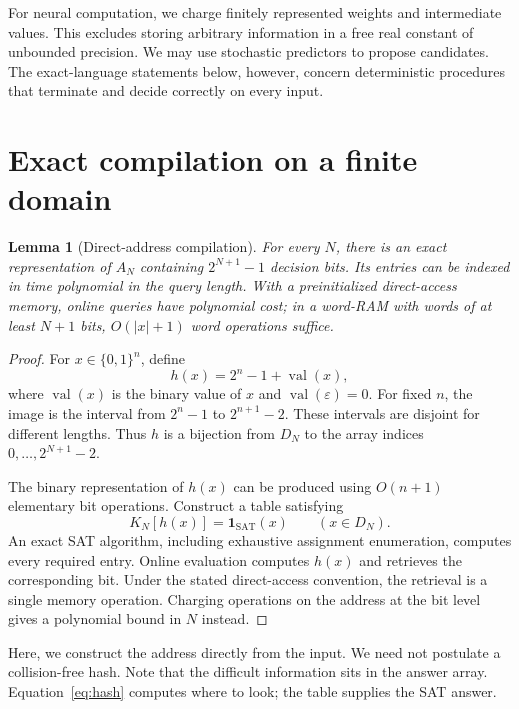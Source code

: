 \documentclass[11pt,a4paper]{article}
\numberwithin{equation}{section}
\newcommand{\SAT}{\mathrm{SAT}}
\newcommand{\bits}{\{0,1\}}
\newcommand{\ind}{\mathbf{1}}
\newcommand{\val}{\operatorname{val}}
\theoremstyle{plain}
\newtheorem{lemma}{Lemma}[section]
\theoremstyle{definition}
\theoremstyle{remark}
\begin{document}
For neural computation, we charge finitely represented weights and intermediate values. This excludes storing arbitrary information in a free real constant of unbounded precision. We may use stochastic predictors to propose candidates. The exact-language statements below, however, concern deterministic procedures that terminate and decide correctly on every input.

\section{Exact compilation on a finite domain}
\label{sec:table}

\begin{lemma}[Direct-address compilation]
\label{lem:table}
For every $N$, there is an exact representation of $A_N$ containing $2^{N+1}-1$ decision bits. Its entries can be indexed in time polynomial in the query length. With a preinitialized direct-access memory, online queries have polynomial cost; in a word-RAM with words of at least $N+1$ bits, $O(|x|+1)$ word operations suffice.
\end{lemma}

\begin{proof}
For $x\in\bits^n$, define
\begin{equation}
h(x)=2^n-1+\val(x),
\label{eq:hash}
\end{equation}
where $\val(x)$ is the binary value of $x$ and $\val(\varepsilon)=0$. For fixed $n$, the image is the interval from $2^n-1$ to $2^{n+1}-2$. These intervals are disjoint for different lengths. Thus $h$ is a bijection from $D_N$ to the array indices $0,\ldots,2^{N+1}-2$.

The binary representation of $h(x)$ can be produced using $O(n+1)$ elementary bit operations. Construct a table satisfying
\begin{equation}
K_N[h(x)]=\ind_{\SAT}(x)\qquad(x\in D_N).
\end{equation}
An exact SAT algorithm, including exhaustive assignment enumeration, computes every required entry. Online evaluation computes $h(x)$ and retrieves the corresponding bit. Under the stated direct-access convention, the retrieval is a single memory operation. Charging operations on the address at the bit level gives a polynomial bound in $N$ instead.
\end{proof}

Here, we construct the address directly from the input. We need not postulate a collision-free hash. Note that the difficult information sits in the answer array. Equation~\eqref{eq:hash} computes where to look; the table supplies the SAT answer.
\end{document}
